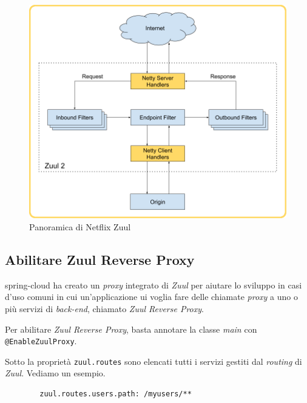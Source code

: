 \begin{figure}[H]
	\centering
	\includegraphics[width=\textwidth]{immagini/zuul.png}
	\caption[Panoramica di Netflix Zuul]{Panoramica di Netflix Zuul\footnotemark}
	\label{netflix-zuul}
\end{figure}

\subsection{Abilitare Zuul Reverse Proxy} \gls{spring-cloud} ha creato un \textit{proxy} integrato di \textit{Zuul} per aiutare lo sviluppo in casi d'uso comuni in cui un'applicazione \gls{ui} voglia fare delle chiamate \textit{proxy} a uno o più servizi di \textit{back-end}, chiamato \textit{Zuul Reverse Proxy}.

Per abilitare \textit{Zuul Reverse Proxy}, basta annotare la classe \textit{main} con \texttt{@EnableZuulProxy}.

Sotto la proprietà \texttt{zuul.routes} sono elencati tutti i servizi gestiti dal \textit{routing} di \textit{Zuul}.
Vediamo un esempio.

\begin{tcolorbox}
	\begin{verbatim}
		zuul.routes.users.path: /myusers/**
	\end{verbatim}
\end{tcolorbox}

